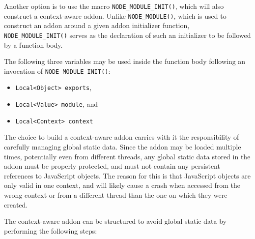 Another option is to use the macro \texttt{NODE\_MODULE\_INIT()}, which
will also construct a context-aware addon. Unlike
\texttt{NODE\_MODULE()}, which is used to construct an addon around a
given addon initializer function, \texttt{NODE\_MODULE\_INIT()} serves
as the declaration of such an initializer to be followed by a function
body.

The following three variables may be used inside the function body
following an invocation of \texttt{NODE\_MODULE\_INIT()}:

\begin{itemize}
\tightlist
\item
  \texttt{Local\textless{}Object\textgreater{}\ exports},
\item
  \texttt{Local\textless{}Value\textgreater{}\ module}, and
\item
  \texttt{Local\textless{}Context\textgreater{}\ context}
\end{itemize}

The choice to build a context-aware addon carries with it the
responsibility of carefully managing global static data. Since the addon
may be loaded multiple times, potentially even from different threads,
any global static data stored in the addon must be properly protected,
and must not contain any persistent references to JavaScript objects.
The reason for this is that JavaScript objects are only valid in one
context, and will likely cause a crash when accessed from the wrong
context or from a different thread than the one on which they were
created.

The context-aware addon can be structured to avoid global static data by
performing the following steps:

